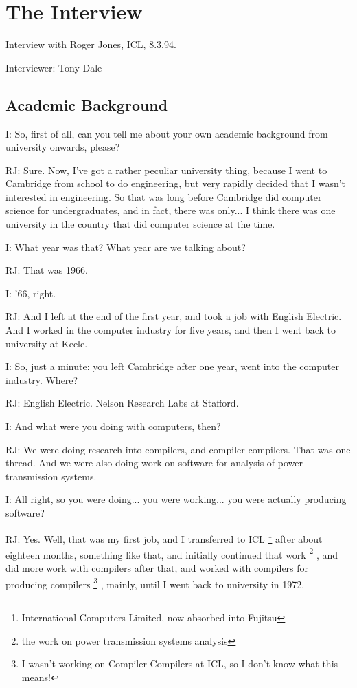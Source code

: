 \documentclass[10pt,titlepage]{book}
\begin{document}
\chapter{The Interview}

Interview with Roger Jones, ICL, 8.3.94.

Interviewer: Tony Dale 

\section{Academic Background} 

I: So, first of all, can you tell me about your own academic background from university onwards, please?

RJ: Sure. Now, I've got a rather peculiar university thing, because I went to Cambridge from school to do engineering, but very rapidly decided that I wasn't interested in engineering. So that was long before Cambridge did computer science for undergraduates, and in fact, there was only... I think there was one university in the country that did computer science at the time.

I: What year was that? What year are we talking about?

RJ: That was 1966.

I: '66, right.

RJ: And I left at the end of the first year, and took a job with English Electric. And I worked in the computer industry for five years, and then I went back to university at Keele.

I: So, just a minute: you left Cambridge after one year, went into the computer industry. Where?

RJ: English Electric. Nelson Research Labs at Stafford.

I: And what were you doing with computers, then?

RJ: We were doing research into compilers, and compiler compilers. That was one thread. And we were also doing work on software for analysis of power transmission systems.

I: All right, so you were doing... you were working... you were actually producing software?

RJ: Yes. Well, that was my first job, and I transferred to ICL%
\footnote{
International Computers Limited, now absorbed into Fujitsu}%
after about eighteen months, something like that, and initially continued that work%
\footnote{
the work on power transmission systems analysis}%
, and did more work with compilers after that, and worked with compilers for producing compilers%
\footnote{
I wasn't working on Compiler Compilers at ICL, so I don't know what this means!}%
, mainly, until I went back to university in 1972.
\end{document}
